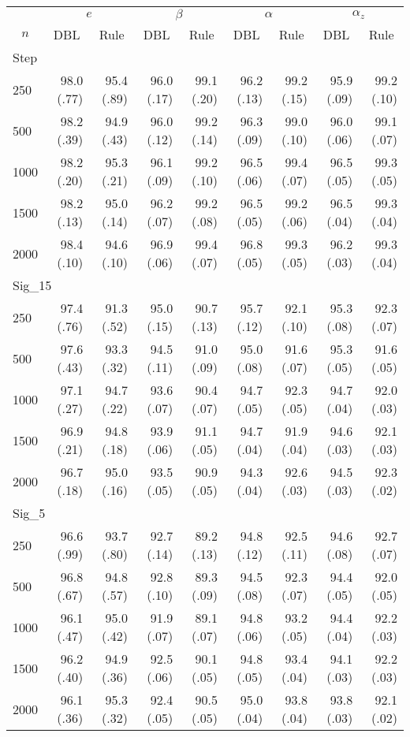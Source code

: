 \begin{tabular}{lrrrrrrrr}
   \hline
 
       &  \multicolumn{2}{c}{$e$}    & \multicolumn{2}{c}{$\beta$}  & \multicolumn{2}{c}{$\alpha$}  & \multicolumn{2}{c}{$\alpha_z$} \\ 
         \multicolumn{1}{c}{$n$} & \multicolumn{1}{c}{DBL}& \multicolumn{1}{c}{Rule}& \multicolumn{1}{c}{DBL}& \multicolumn{1}{c}{Rule}& \multicolumn{1}{c}{DBL}& \multicolumn{1}{c}{Rule}& \multicolumn{1}{c}{DBL}& \multicolumn{1}{c}{Rule} \\ \hline
            
 \multicolumn{9}{l}{Step} \\ 
250 & 98.0 (.77) & 95.4 (.89) & 96.0 (.17) & 99.1 (.20) & 96.2 (.13) & 99.2 (.15) & 95.9 (.09) & 99.2 (.10) \\ 
  500 & 98.2 (.39) & 94.9 (.43) & 96.0 (.12) & 99.2 (.14) & 96.3 (.09) & 99.0 (.10) & 96.0 (.06) & 99.1 (.07) \\ 
  1000 & 98.2 (.20) & 95.3 (.21) & 96.1 (.09) & 99.2 (.10) & 96.5 (.06) & 99.4 (.07) & 96.5 (.05) & 99.3 (.05) \\ 
  1500 & 98.2 (.13) & 95.0 (.14) & 96.2 (.07) & 99.2 (.08) & 96.5 (.05) & 99.2 (.06) & 96.5 (.04) & 99.3 (.04) \\ 
  2000 & 98.4 (.10) & 94.6 (.10) & 96.9 (.06) & 99.4 (.07) & 96.8 (.05) & 99.3 (.05) & 96.2 (.03) & 99.3 (.04) \\ 
          
 \multicolumn{9}{l}{Sig\_15} \\ 
250 & 97.4 (.76) & 91.3 (.52) & 95.0 (.15) & 90.7 (.13) & 95.7 (.12) & 92.1 (.10) & 95.3 (.08) & 92.3 (.07) \\ 
  500 & 97.6 (.43) & 93.3 (.32) & 94.5 (.11) & 91.0 (.09) & 95.0 (.08) & 91.6 (.07) & 95.3 (.05) & 91.6 (.05) \\ 
  1000 & 97.1 (.27) & 94.7 (.22) & 93.6 (.07) & 90.4 (.07) & 94.7 (.05) & 92.3 (.05) & 94.7 (.04) & 92.0 (.03) \\ 
  1500 & 96.9 (.21) & 94.8 (.18) & 93.9 (.06) & 91.1 (.05) & 94.7 (.04) & 91.9 (.04) & 94.6 (.03) & 92.1 (.03) \\ 
  2000 & 96.7 (.18) & 95.0 (.16) & 93.5 (.05) & 90.9 (.05) & 94.3 (.04) & 92.6 (.03) & 94.5 (.03) & 92.3 (.02) \\ 
          
 \multicolumn{9}{l}{Sig\_5} \\ 
250 & 96.6 (.99) & 93.7 (.80) & 92.7 (.14) & 89.2 (.13) & 94.8 (.12) & 92.5 (.11) & 94.6 (.08) & 92.7 (.07) \\ 
  500 & 96.8 (.67) & 94.8 (.57) & 92.8 (.10) & 89.3 (.09) & 94.5 (.08) & 92.3 (.07) & 94.4 (.05) & 92.0 (.05) \\ 
  1000 & 96.1 (.47) & 95.0 (.42) & 91.9 (.07) & 89.1 (.07) & 94.8 (.06) & 93.2 (.05) & 94.4 (.04) & 92.2 (.03) \\ 
  1500 & 96.2 (.40) & 94.9 (.36) & 92.5 (.06) & 90.1 (.05) & 94.8 (.05) & 93.4 (.04) & 94.1 (.03) & 92.2 (.03) \\ 
  2000 & 96.1 (.36) & 95.3 (.32) & 92.4 (.05) & 90.5 (.05) & 95.0 (.04) & 93.8 (.04) & 93.8 (.03) & 92.1 (.02) \\ 
          

\end{tabular}

